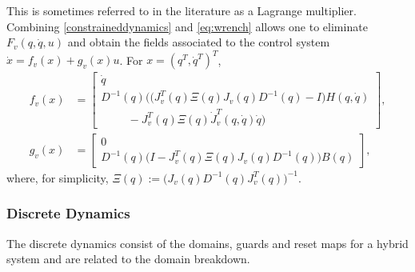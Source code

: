 This is sometimes referred to in the literature as a Lagrange multiplier.\cite{MLS94}\xspace Combining \eqref{constraineddynamics} and \eqref{eq:wrench} allows one to eliminate $F_{v}(q, {\dot q}, u)$ and obtain the fields associated to the control system $\dot{x} = f_{v}(x) + g_{v}(x) u$. For $x = (q^{T}, {\dot q}^{T})^{T}$,
\begin{align}
  f_{v}(x) \!\! &= \!\!\! \left[\!\!\!\begin{array}{c}
    \dot{q}\\
    D^{-1}(q)\Big( \big(J_{v}^{T}(q) \Xi(q) J_{v}(q) D^{-1}(q) - I \big) H(q, {\dot q}) \\
    \hspace{1cm}- J_{v}^{T}(q) \Xi(q) {\dot J}_{v}^{T}(q, {\dot q}) {\dot q} \Big)
    \end{array}\!\!\!\right],\\
  \label{eqn:controlsystem}
  g_{v}(x) \!\! &= \!\!\! \left[\!\!\!\begin{array}{c}
    0\\
    D^{-1}(q) \big(I - J_{v}^{T}(q) \Xi(q) J_{v}(q) D^{-1}(q) \big) B(q)
    \end{array}\!\!\!\right],
\end{align}
where, for simplicity, $\Xi(q) := \big( J_{v}(q) D^{-1}(q) J_{v}^{T}(q) \big)^{-1}$.

\subsubsection{Discrete Dynamics}
The discrete dynamics consist of the domains, guards and reset maps for a hybrid system and are related to the domain breakdown.

